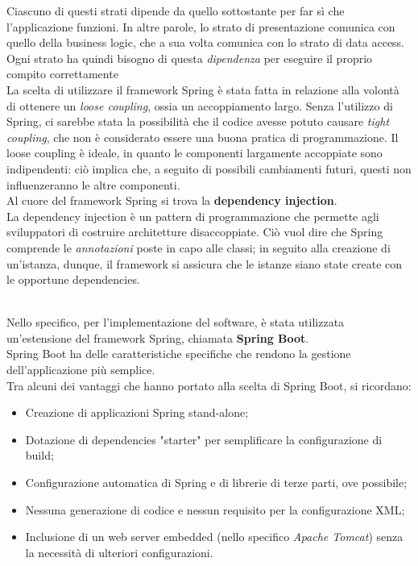 \documentclass{natourDoc}
\begin{document}
Ciascuno di questi strati dipende da quello sottostante per far sì che l'applicazione funzioni. In altre parole,
lo strato di presentazione comunica con quello della business logic, che a sua volta comunica con lo strato di data
access. Ogni strato ha quindi bisogno di questa \textit{dipendenza} per eseguire il proprio compito correttamente \\

La scelta di utilizzare il framework Spring è stata fatta in relazione alla volontà di ottenere un \textit{loose coupling}, ossia un accoppiamento largo.
Senza l'utilizzo di Spring, ci sarebbe stata la possibilità che il codice avesse potuto causare \textit{tight coupling}, che non è
considerato essere una buona pratica di programmazione. Il loose coupling è ideale, in quanto le componenti largamente
accoppiate sono indipendenti: ciò implica che, a seguito di possibili cambiamenti futuri, questi non influenzeranno
le altre componenti.\\

Al cuore del framework Spring si trova la \textbf{dependency injection}. \\
La dependency injection è un pattern di programmazione che permette agli sviluppatori di costruire architetture disaccoppiate. Ciò vuol dire che Spring comprende le \textit{annotazioni}
poste in capo alle classi; in seguito alla creazione di un'istanza, dunque, il framework si assicura che le istanze siano state create con le opportune dependencies. \\\

Nello specifico, per l'implementazione del software, è stata utilizzata un'estensione del framework Spring, chiamata \textbf{Spring Boot}.\\
Spring Boot ha delle caratteristiche specifiche che rendono la gestione dell'applicazione più semplice.\\
Tra alcuni dei vantaggi che hanno portato alla scelta di Spring Boot, si ricordano:
\begin{itemize}
	\item Creazione di applicazioni Spring stand-alone;
	\item Dotazione di dependencies "starter" per semplificare la configurazione di build;
	\item Configurazione automatica di Spring e di librerie di terze parti, ove possibile;
	\item Nessuna generazione di codice e nessun requisito per la configurazione XML;
	\item Inclusione di un web server embedded (nello specifico \textit{Apache Tomcat}) senza la necessità di ulteriori configurazioni.
\end{itemize}
\end{document}
